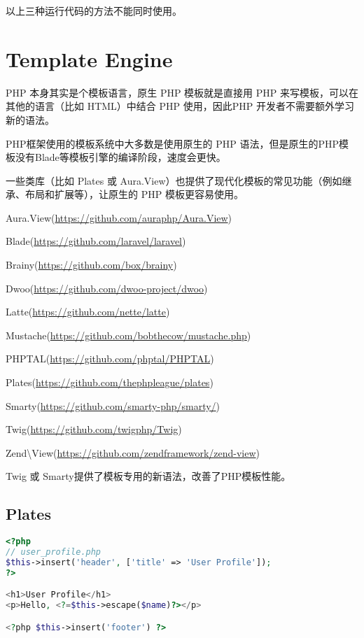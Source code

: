 以上三种运行代码的方法不能同时使用。




\section{Template Engine}

PHP 本身其实是个模板语言，原生 PHP 模板就是直接用 PHP 来写模板，可以在其他的语言（比如 HTML）中结合 PHP 使用，因此PHP 开发者不需要额外学习新的语法。

PHP框架使用的模板系统中大多数是使用原生的 PHP 语法，但是原生的PHP模板没有Blade等模板引擎的编译阶段，速度会更快。

一些类库（比如 Plates 或 Aura.View）也提供了现代化模板的常见功能（例如继承、布局和扩展等），让原生的 PHP 模板更容易使用。

\begin{compactitem}
\item Aura.View(\url{https://github.com/auraphp/Aura.View})
\item Blade(\url{https://github.com/laravel/laravel})
\item Brainy(\url{https://github.com/box/brainy})
\item Dwoo(\url{https://github.com/dwoo-project/dwoo})
\item Latte(\url{https://github.com/nette/latte})
\item Mustache(\url{https://github.com/bobthecow/mustache.php})
\item PHPTAL(\url{https://github.com/phptal/PHPTAL})
\item Plates(\url{https://github.com/thephpleague/plates})
\item Smarty(\url{https://github.com/smarty-php/smarty/})
\item Twig(\url{https://github.com/twigphp/Twig})
\item Zend\textbackslash View(\url{https://github.com/zendframework/zend-view})
\end{compactitem}

Twig 或 Smarty提供了模板专用的新语法，改善了PHP模板性能。

\subsection{Plates}

\begin{lstlisting}[language=PHP]
<?php
// user_profile.php
$this->insert('header', ['title' => 'User Profile']);
?>

<h1>User Profile</h1>
<p>Hello, <?=$this->escape($name)?></p>

<?php $this->insert('footer') ?>
\end{lstlisting}

